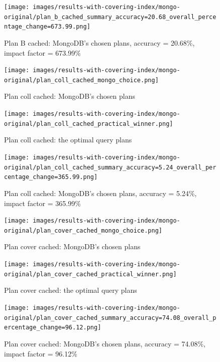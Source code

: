\begin{figure}[htb]
    \centering
    \texttt{[image: images/results-with-covering-index/mongo-original/plan\_b\_cached\_summary\_accuracy=20.68\_overall\_percentage\_change=673.99.png]}
    \caption{Plan B cached: MongoDB's chosen plans, accuracy = 20.68\%, impact factor = 673.99\%}
    \label{fig:cover-b-cached-impact-v0}
\end{figure}


\begin{figure}[htb]
    \centering
    \texttt{[image: images/results-with-covering-index/mongo-original/plan\_coll\_cached\_mongo\_choice.png]}
    \caption{Plan coll cached: MongoDB's chosen plans}
    \label{fig:cover-coll-cached-v0}
\end{figure}


\begin{figure}[htb]
    \centering
    \texttt{[image: images/results-with-covering-index/mongo-original/plan\_coll\_cached\_practical\_winner.png]}
    \caption{Plan coll cached: the optimal query plans}
    \label{fig:cover-coll-cached-optimal-v0}
\end{figure}


\begin{figure}[htb]
    \centering
    \texttt{[image: images/results-with-covering-index/mongo-original/plan\_coll\_cached\_summary\_accuracy=5.24\_overall\_percentage\_change=365.99.png]}
    \caption{Plan coll cached: MongoDB's chosen plans, accuracy = 5.24\%, impact factor = 365.99\%}
    \label{fig:cover-coll-cached-impact-v0}
\end{figure}

\begin{figure}[htb]
    \centering
    \texttt{[image: images/results-with-covering-index/mongo-original/plan\_cover\_cached\_mongo\_choice.png]}
    \caption{Plan cover cached: MongoDB's chosen plans}
    \label{fig:cover-cover-cached-v0}
\end{figure}


\begin{figure}[htb]
    \centering
    \texttt{[image: images/results-with-covering-index/mongo-original/plan\_cover\_cached\_practical\_winner.png]}
    \caption{Plan cover cached: the optimal query plans}
    \label{fig:cover-cover-cached-optimal-v0}
\end{figure}


\begin{figure}[htb]
    \centering
    \texttt{[image: images/results-with-covering-index/mongo-original/plan\_cover\_cached\_summary\_accuracy=74.08\_overall\_percentage\_change=96.12.png]}
    \caption{Plan cover cached: MongoDB's chosen plans, accuracy = 74.08\%, impact factor = 96.12\%}
    \label{fig:cover-cover-cached-impact-v0}
\end{figure}